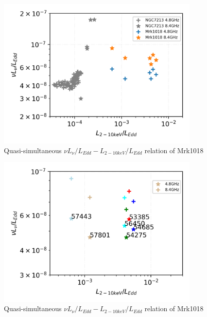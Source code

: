 \begin{figure}
\centering
	\includegraphics[width=0.9\textwidth]{./pic/Mrk1018_ngc7213_radio_xray_rate.png}
    \caption{Quasi-simultaneous $\nu L_{\nu}/L_{Edd}-L_{2-10keV}/L_{Edd}$ relation of Mrk1018}
    \label{fig:radio-xray-rate_relation_plus_ngc7213}
\end{figure}


\begin{figure}
\centering
	\includegraphics[width=0.9\textwidth]{./pic/Mrk1018_radio_xray_sel1_rate.png}
    \caption{Quasi-simultaneous $\nu L_{\nu}/L_{Edd}-L_{2-10keV}/L_{Edd}$ relation of Mrk1018}
    \label{fig:radio-xray-relation}
\end{figure}



